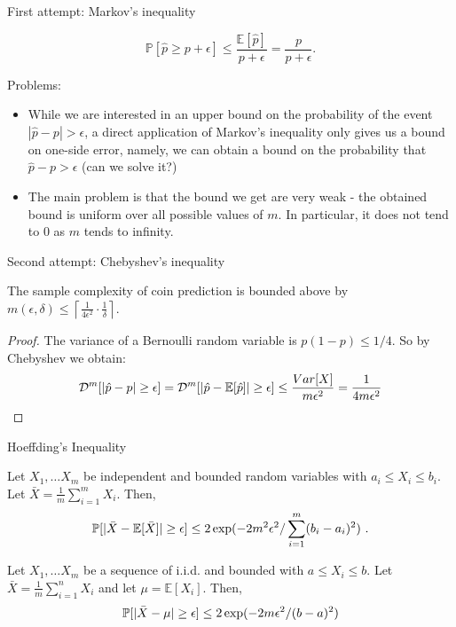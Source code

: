 \documentclass[11pt, usenames, dvipsnames]{beamer}
\begin{document}
\begin{frame}{First attempt: Markov's inequality}
\begin{claim}
$$ \mathbb{P}[\hat{p} \geq p + \epsilon] \leq \frac{\mathbb{E}[\hat{p}]}{p+\epsilon} = \frac{p}{p+\epsilon}. $$
\end{claim}
\pause
Problems:
\begin{itemize}
    \item While we are interested in an upper bound on the probability of the event $|\hat{p}-p| > \epsilon$, a direct application of Markov's inequality only gives us a bound on one-side error, namely, we can obtain a bound on the probability that $\hat{p} - p > \epsilon$ (can we solve it?)
    \pause
    \item The main problem is that the bound we get are very weak - the obtained bound is uniform over all possible values of $m$. In particular, it does not tend to $0$ as $m$ tends to infinity.
\end{itemize}
\end{frame}

\begin{frame}{Second attempt: Chebyshev's inequality}
\begin{claim}
The sample complexity of coin prediction is bounded above by
$m(\epsilon,\delta) \le \left \lceil \frac{1}{4\epsilon^2} \cdot
  \frac{1}{\delta} \right \rceil$.
\end{claim}  
\pause
\begin{proof}
The variance of a Bernoulli random variable is $p(1-p) \le 1/4$. So by Chebyshev we obtain: 
$$
\mathcal{D}^m [|\hat{p}-p| \geq \epsilon] = \mathcal{D}^m[|\hat{p}-\mathbb{E} [\hat{p}]| \ge \epsilon] \le \frac{Var[X]}{m\epsilon^2} = \frac{1}{4m \epsilon ^2}
$$
\end{proof}
\end{frame}

\begin{frame}{Hoeffding's Inequality}
\begin{theorem}
Let $X_1, \ldots X_m$ be independent and bounded random variables with $a_i \le X_i \le b_i$. Let $\bar{X} = \frac{1}{m} \sum_{i=1} ^m X_i$. Then,
$$
\mathbb{P} [ |\bar{X} - \mathbb{E}[\bar{X}]| \ge \epsilon ] \le 2 \exp(-2m^2 \epsilon^2 / \sum _{i =1} ^m (b_i-a_i)^2)~.
$$
\end{theorem}
\pause
\begin{corollary}
Let $X_1, \ldots X_m$ be a sequence of i.i.d. and bounded with $a \le X_i \le b$. Let $\bar{X} = \frac{1}{m} \sum_{i=1} ^n X_i$ and let $\mu = \mathbb{E}[X_i]$. Then,
$$
\mathbb{P} [|\bar{X} - \mu| \ge \epsilon] \le 2 \exp(-2 m \epsilon^2 / (b-a)^2) 
$$
\end{corollary}
\end{frame}
\end{document}
